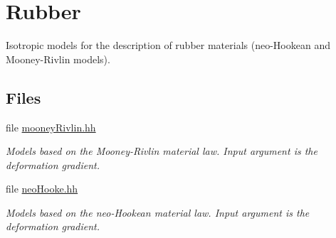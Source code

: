 \hypertarget{group__Rubber}{\section{Rubber}
\label{group__Rubber}
}


Isotropic models for the description of rubber materials (neo-\/\-Hookean and Mooney-\/\-Rivlin models).  


\subsection*{Files}
\begin{DoxyCompactItemize}
\item 
file \hyperlink{mooneyRivlin_8hh}{mooney\-Rivlin.\-hh}
\begin{DoxyCompactList}\small\item\em Models based on the Mooney-\/\-Rivlin material law. Input argument is the deformation gradient. \end{DoxyCompactList}\item 
file \hyperlink{neoHooke_8hh}{neo\-Hooke.\-hh}
\begin{DoxyCompactList}\small\item\em Models based on the neo-\/\-Hookean material law. Input argument is the deformation gradient. \end{DoxyCompactList}\end{DoxyCompactItemize}
